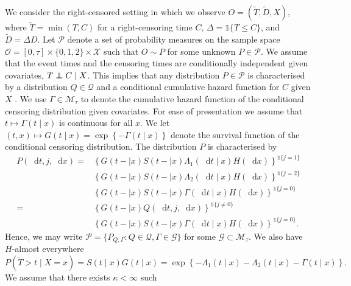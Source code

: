 \documentclass[a4paper,danish]{article}
\theoremstyle{plain} %
\numberwithin{theorem}{section}
\theoremstyle{definition} %
\theoremstyle{remark}
\newcommand\independent{\protect\mathpalette{\protect\independenT}{\perp}}
\def\independenT#1#2{\mathrel{\rlap{$#1#2$}\mkern2mu{#1#2}}}
\newcommand*\diff{\mathop{}\!\mathrm{d}}
\newcommand{\1}{\mathds{1}}
\begin{document}
We consider the right-censored setting in which we observe \(O =
(\tilde{T},\tilde D, X)\), where $\tilde T = \min(T,C)$ for a
right-censoring time \(C\), $\Delta = \1{\{T \leq C\}}$, and \(\tilde
D=\Delta D\). Let \(\mathcal{P}\) denote a set of probability measures
on the sample space \(\mathcal{O} = [0, \tau] \times \{0, 1, 2\}
\times \mathcal{X}\) such that \(O \sim P \) for some unknown \(P\in
\mathcal{P}\). We assume that the event times and the censoring times
are conditionally independent given covariates, \( T \independent C
\mid X \). This implies that any distribution \( P \in \mathcal{P} \)
is characterised by a distribution \( Q \in \mathcal{Q} \) and a
conditional cumulative hazard function for \( C \) given \( X \)
\citep[c.f.,][]{begun1983information,gill1997coarsening}. We use
\(\Gamma\in\mathcal{M}_{\tau}\) to denote the cumulative hazard
function of the conditional censoring distribution given
covariates. For ease of presentation we assume that \(t\mapsto
\Gamma(t \mid x) \) is continuous for all \( x \). We let
\((t,x)\mapsto G(t \mid x)=\exp\left\{-\Gamma(t \mid x)\right\}\)
denote the survival function of the conditional censoring
distribution. The distribution \( P \) is characterised by
\begin{equation}\label{eq:parametrizeP}
  \begin{split}
    P(\diff t, j, \diff x) =& \left\{G(t- \mid x)S(t- \mid x)\Lambda_1(\diff t \mid x)H(\diff x)\right\}^{\1{{\{j=1\}}}}\\
                            & \left\{G(t- \mid x)S(t- \mid x)\Lambda_2(\diff t \mid x)H(\diff x)\right\}^{\1{{\{j=2\}}}}\\
                            & \left\{G(t- \mid x)S(t- \mid x)\Gamma(\diff t \mid x)H(\diff x)\right\}^{\1{{\{j=0\}}}}\\
    = & \left\{G(t- \mid x)Q(\diff t,j,\diff x)\right\}^{\1{{\{j\ne 0\}}}}\\    
                            & \left\{G(t- \mid x)S(t- \mid x)\Gamma(\diff t \mid x)H(\diff x)\right\}^{\1{{\{j=0\}}}}.
  \end{split}
\end{equation}
Hence, we may write
\( \mathcal{P} = \{ P_{Q, \Gamma} : Q \in \mathcal{Q}, \Gamma \in
\mathcal{G} \} \) for some \( \mathcal{G} \subset \mathcal{M}_{\tau} \). We
also have \(H\)-almost everywhere
\begin{equation*}
P(\tilde T>t \mid X=x) = S(t \mid x)G(t \mid x) = \exp\left\{-\Lambda_{1}(t \mid x)-\Lambda_{2}(t \mid x)-\Gamma(t \mid x) \right\}.
\end{equation*} We assume that there exists \(\kappa<\infty\) such
\end{document}
